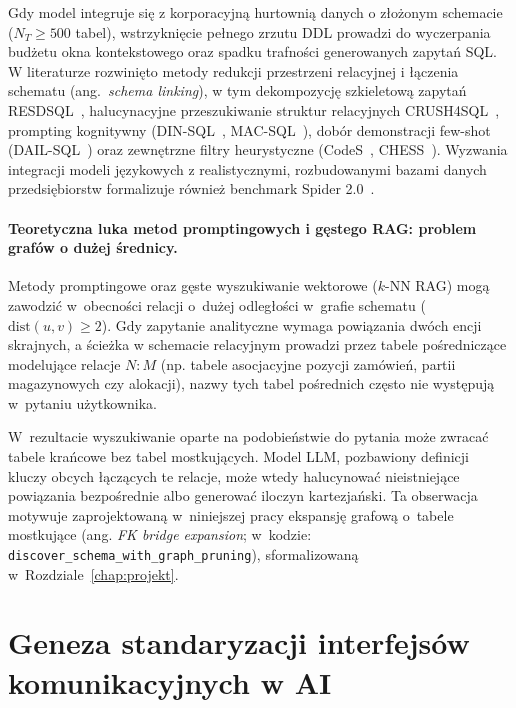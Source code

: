 Gdy model integruje się z korporacyjną hurtownią danych o złożonym schemacie ($N_T \ge 500$ tabel), wstrzyknięcie pełnego zrzutu DDL prowadzi do wyczerpania budżetu okna kontekstowego oraz spadku trafności generowanych zapytań SQL. W literaturze rozwinięto metody redukcji przestrzeni relacyjnej i łączenia schematu (ang.~\emph{schema linking}), w tym dekompozycję szkieletową zapytań RESDSQL~\cite{li2023resdsql}, halucynacyjne przeszukiwanie struktur relacyjnych CRUSH4SQL~\cite{kothyari2023crush4sql}, prompting kognitywny (DIN-SQL~\cite{pourreza2023dinsql}, MAC-SQL~\cite{wang2025macsql}), dobór demonstracji few-shot (DAIL-SQL~\cite{gao2024dailsql}) oraz zewnętrzne filtry heurystyczne (CodeS~\cite{li2024codes}, CHESS~\cite{talaei2025chess}). Wyzwania integracji modeli językowych z realistycznymi, rozbudowanymi bazami danych przedsiębiorstw formalizuje również benchmark Spider 2.0~\cite{lei2025spider2}.

\paragraph{Teoretyczna luka metod promptingowych i gęstego RAG: problem grafów o dużej średnicy.}
Metody promptingowe oraz gęste wyszukiwanie wektorowe ($k$-NN RAG) mogą zawodzić w~obecności relacji o~dużej odległości w~grafie schematu ($\text{dist}(u, v) \ge 2$). Gdy zapytanie analityczne wymaga powiązania dwóch encji skrajnych, a ścieżka w schemacie relacyjnym prowadzi przez tabele pośredniczące modelujące relacje $N:M$ (np. tabele asocjacyjne pozycji zamówień, partii magazynowych czy alokacji), nazwy tych tabel pośrednich często nie występują w~pytaniu użytkownika.

W~rezultacie wyszukiwanie oparte na podobieństwie do pytania może zwracać tabele krańcowe bez tabel mostkujących. Model LLM, pozbawiony definicji kluczy obcych łączących te relacje, może wtedy halucynować nieistniejące powiązania bezpośrednie albo generować iloczyn kartezjański. Ta obserwacja motywuje zaprojektowaną w~niniejszej pracy ekspansję grafową o~tabele mostkujące (ang. \emph{FK bridge expansion}; w~kodzie: \texttt{discover\_schema\_with\_graph\_pruning}), sformalizowaną w~Rozdziale~\ref{chap:projekt}.


\section{Geneza standaryzacji interfejsów komunikacyjnych w AI}
\label{sec:teoria_geneza_standaryzacji}

